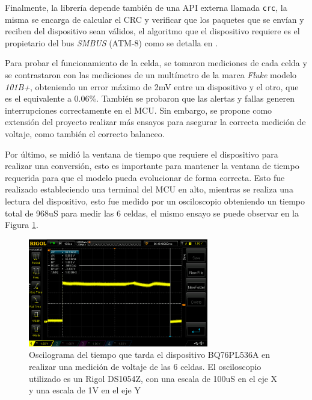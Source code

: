 \documentclass[10pt, a4paper]{report}
\begin{document}
Finalmente, la librer\'ia depende tambi\'en de una \acrshort{API} externa
llamada \texttt{crc}, la misma se encarga de calcular el \acrshort{CRC} y 
verificar que los paquetes que se env\'ian y reciben del dispositivo sean
v\'alidos, el algoritmo que el dispositivo requiere es el propietario del bus
\emph{SMBUS} (ATM-8) como se detalla en \cite{bq76_comm_basics}.

Para probar el funcionamiento de la celda, se tomaron mediciones de cada celda 
y se contrastaron con las mediciones de un mult\'imetro de la marca \emph{Fluke}
modelo \emph{101B+}, obteniendo un error m\'aximo de 2mV entre un dispositivo y
el otro, que es el equivalente a 0.06\%. Tambi\'en se probaron que las alertas y
fallas generen interrupciones correctamente en el \acrshort{MCU}. Sin embargo, 
se propone como extensi\'on del proyecto realizar m\'as ensayos para asegurar la 
correcta medici\'on de voltaje, como tambi\'en el correcto balanceo.

Por \'ultimo, se midi\'o la ventana de tiempo que requiere el dispositivo para
realizar una conversi\'on, esto es importante para mantener la ventana de tiempo
requerida para que el modelo pueda evolucionar de forma correcta. Esto fue realizado
estableciendo una terminal del \acrshort{MCU} en alto, mientras se realiza una
lectura del dispositivo, esto fue medido por un osciloscopio obteniendo un
tiempo total de 968uS para medir las 6 celdas, el mismo ensayo se puede observar 
en la Figura \ref{bq76_v_cell_time}.

\begin{figure}[h!]
    \begin{center}
        \includegraphics[width=0.7\textwidth]{bq76_v_cell_time.png}
        \caption{Oscilograma del tiempo que tarda el dispositivo BQ76PL536A en
        realizar una medici\'on de voltaje de las 6 celdas. El osciloscopio
        utilizado es un Rigol DS1054Z, con una escala de 100uS en el eje X y una
        escala de 1V en el eje Y}
        \label{bq76_v_cell_time}
    \end{center}
\end{figure}
\FloatBarrier
\end{document}
